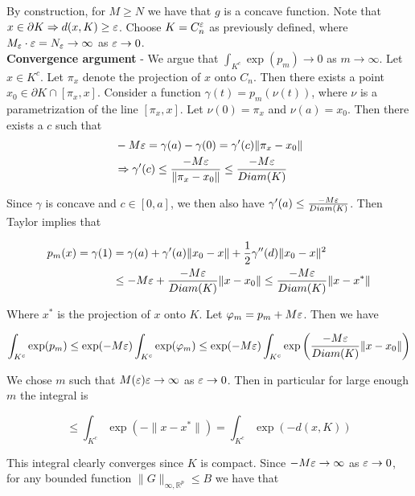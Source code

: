 \documentclass[11pt,reqno]{amsart}
\numberwithin{equation}{section}
\newcommand{\lft}{\left(}
\newcommand{\rt}{\right)}
\newcommand{\mr}{\mathbb{R}}
\newcommand{\tb}{\textbf}
\newcommand{\pa}{\partial}
\begin{document}
By construction, for $M \geq N$ we have that $g$ is a concave function. Note that $x \in \pa K \implies d(x,K) \geq \eps$. Choose $K = C_n^{\varepsilon}$ as previously defined, where $M_{\varepsilon} \cdot \varepsilon = N_{\varepsilon} \rightarrow \infty$ as $\varepsilon \rightarrow 0$.\\

\tb{Convergence argument} - We argue that $\int_{K^c} \exp(p_m) \to 0$ as $m \to \infty$. Let $x \in K^c$. Let $\pi_x$ denote the projection of $x$ onto $C_n$. Then there exists a point $x_0 \in \pa K \cap [\pi_x, x]$. Consider a function $\gamma(t) = p_m(\nu(t))$, where $\nu$ is a parametrization of the line $[\pi_x, x]$. Let $\nu(0) = \pi_x$ and $\nu(a) = x_0$. Then there exists a $c$ such that \\

\begin{align*}
&-M \varepsilon = \gamma(a) - \gamma(0) = \gamma'(c) \|\pi_x - x_0\|\\
&\Rightarrow \gamma'(c) \leq \frac{-M \varepsilon}{\|\pi_x - x_0\|} \leq \frac{-M \varepsilon}{Diam(K)} 
\end{align*}

Since $\gamma$ is concave and $c \in [0,a]$, we then also have $\gamma'(a) \leq \frac{-M \varepsilon}{Diam(K)}$. Then Taylor implies that 

\begin{align*}
p_m(x) = \gamma(1) &= \gamma(a) + \gamma'(a) \|x_0 - x\| + \frac{1}{2} \gamma''(d) \|x_0 - x\|^2\\
&\leq -M \varepsilon + \frac{-M \varepsilon}{Diam(K)} \|x - x_0\| \leq \frac{-M \varepsilon}{Diam(K)} \|x - x^*\|
\end{align*} 

Where $x^*$ is the projection of $x$ onto $K$. Let $\varphi_m = p_m + M \varepsilon $. Then we have 

\begin{align*}
\int_{K^c} \exp(p_m) \leq \exp(-M \eps) \int_{K^c} \exp(\phi_m) \leq \exp(-M \eps) \int_{K^c} \exp \lft \frac{-M \eps}{Diam(K)}\|x - x_0\| \rt 
\end{align*}

We chose $m$ such that $M(\varepsilon) \varepsilon \rightarrow \infty$ as $\varepsilon \rightarrow 0$. Then in particular for large enough $m$ the integral is 

\[
\leq \int_{K^c} \exp \lft -\|x - x^*\| \rt  = \int_{K^c} \exp \lft -d(x,K) \rt 
\]

This integral clearly converges since $K$ is compact. Since $-M \varepsilon \rightarrow \infty$ as $\varepsilon \rightarrow 0$, for any bounded function $\|G\|_{\infty, \mr^p} \leq B$ we have that 
\end{document}

